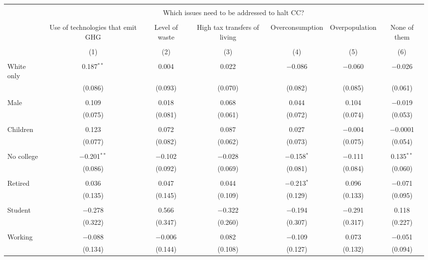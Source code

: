 
\begin{tabular}{@{\extracolsep{5pt}}lcccccc} 
\\[-1.8ex]\hline 
\hline \\[-1.8ex] 
 & \multicolumn{6}{c}{Which issues need to be addressed to halt CC?} \\ 
\cline{2-7} 
\\[-1.8ex] & Use of technologies that emit GHG & Level of waste & High tax transfers of living & Overconsumption & Overpopulation & None of them \\ 
\\[-1.8ex] & (1) & (2) & (3) & (4) & (5) & (6)\\ 
\hline \\[-1.8ex] 
 White only & 0.187$^{**}$ & 0.004 & 0.022 & $-$0.086 & $-$0.060 & $-$0.026 \\ 
  & (0.086) & (0.093) & (0.070) & (0.082) & (0.085) & (0.061) \\ 
  & & & & & & \\ 
 Male & 0.109 & 0.018 & 0.068 & 0.044 & 0.104 & $-$0.019 \\ 
  & (0.075) & (0.081) & (0.061) & (0.072) & (0.074) & (0.053) \\ 
  & & & & & & \\ 
 Children & 0.123 & 0.072 & 0.087 & 0.027 & $-$0.004 & $-$0.0001 \\ 
  & (0.077) & (0.082) & (0.062) & (0.073) & (0.075) & (0.054) \\ 
  & & & & & & \\ 
 No college & $-$0.201$^{**}$ & $-$0.102 & $-$0.028 & $-$0.158$^{*}$ & $-$0.111 & 0.135$^{**}$ \\ 
  & (0.086) & (0.092) & (0.069) & (0.081) & (0.084) & (0.060) \\ 
  & & & & & & \\ 
 Retired & 0.036 & 0.047 & 0.044 & $-$0.213$^{*}$ & 0.096 & $-$0.071 \\ 
  & (0.135) & (0.145) & (0.109) & (0.129) & (0.133) & (0.095) \\ 
  & & & & & & \\ 
 Student & $-$0.278 & 0.566 & $-$0.322 & $-$0.194 & $-$0.291 & 0.118 \\ 
  & (0.322) & (0.347) & (0.260) & (0.307) & (0.317) & (0.227) \\ 
  & & & & & & \\ 
 Working & $-$0.088 & $-$0.006 & 0.082 & $-$0.109 & 0.073 & $-$0.051 \\ 
  & (0.134) & (0.144) & (0.108) & (0.127) & (0.132) & (0.094) \\ 

\end{tabular}
